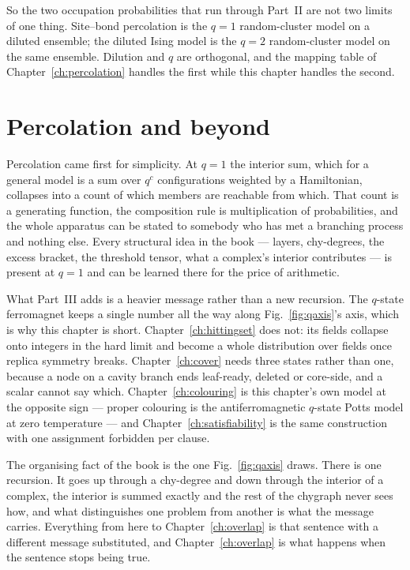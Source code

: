 So the two occupation probabilities that run through Part~II are not two
limits of one thing. Site--bond percolation is the $q=1$ random-cluster model
on a diluted ensemble; the diluted Ising model is the $q=2$ random-cluster
model on the same ensemble. Dilution and $q$ are orthogonal, and the mapping
table of Chapter~\ref{ch:percolation} handles the first while this chapter
handles the second.

\section{Percolation and beyond}
\label{sec:percolation-beyond}

Percolation came first for simplicity. At $q=1$ the interior sum, which for a
general model is a sum over $q^{c}$
configurations weighted by a Hamiltonian, collapses into a count of which
members are reachable from which. That count is a generating function, the
composition rule is multiplication of probabilities, and the whole apparatus can
be stated to somebody who has met a branching process and nothing else. Every
structural idea in the book --- layers, chy-degrees, the excess bracket, the
threshold tensor, what a complex's interior contributes --- is present at $q=1$
and can be learned there for the price of arithmetic.

What Part~III adds is a heavier message rather than a new recursion. The
$q$-state ferromagnet keeps a single number all the way along
Fig.~\ref{fig:qaxis}'s axis, which is why this chapter is short.
Chapter~\ref{ch:hittingset} does not: its fields collapse onto integers in the
hard limit and become a whole distribution over fields once replica symmetry
breaks. Chapter~\ref{ch:cover} needs three states rather than one, because a
node on a cavity branch ends leaf-ready, deleted or core-side, and a scalar
cannot say which.
Chapter~\ref{ch:colouring} is this chapter's own model at the opposite sign
--- proper colouring is the antiferromagnetic $q$-state Potts model at zero
temperature --- and Chapter~\ref{ch:satisfiability} is the same construction
with one assignment forbidden per clause.

The organising fact of the book is the one Fig.~\ref{fig:qaxis} draws. There is
one recursion. It goes up through a chy-degree and down through the interior of
a complex, the interior is summed exactly and the rest of the chygraph never
sees how, and what distinguishes one problem from another is what the message
carries. Everything from here to Chapter~\ref{ch:overlap} is that sentence with
a different message substituted, and Chapter~\ref{ch:overlap} is what happens
when the sentence stops being true.


